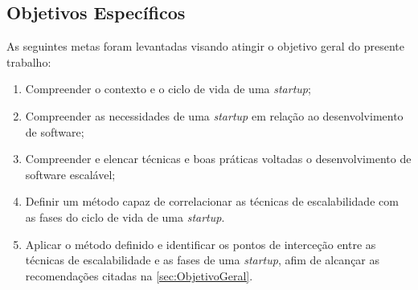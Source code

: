 \subsection{Objetivos Específicos}

As seguintes metas foram levantadas visando atingir o objetivo geral do presente
trabalho:

  \begin{enumerate}
    \item Compreender o contexto e o ciclo de vida de uma \textit{startup};
    \item Compreender as necessidades de uma \textit{startup} em relação ao desenvolvimento de software;
    \item Compreender e elencar técnicas e boas práticas voltadas o desenvolvimento de software
        escalável;
    \item Definir um método capaz de correlacionar as técnicas de escalabilidade com
        as fases do ciclo de vida de uma \textit{startup}.
    \item Aplicar o método definido e identificar os pontos de interceção entre as técnicas de escalabilidade
        e as fases de uma \textit{startup}, afim de alcançar as recomendações citadas na \autoref{sec:ObjetivoGeral}.
  \end{enumerate}
